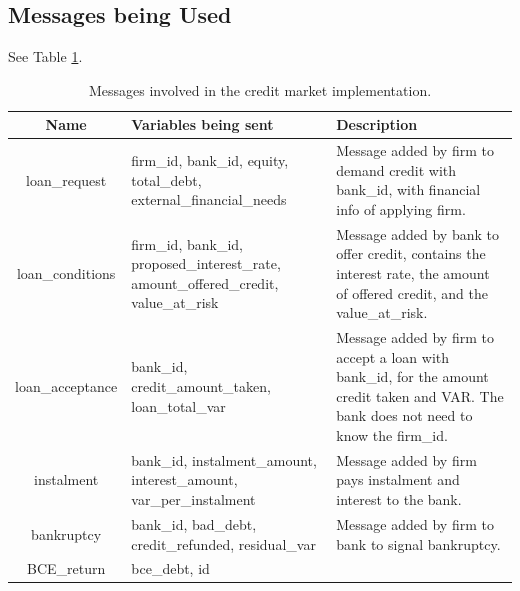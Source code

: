\subsection{Messages being Used}

See Table \ref{tab:creditmarketmsg}.

\begin{table}[!htb]\caption{Messages involved in the credit market implementation.}
\begin{center}
\begin{tabular}{|c|l|l|}
\hline
Name & Variables being sent & Description \\
\hline loan\_request & {\parbox[l]{5cm}{firm\_id, bank\_id, equity,
total\_debt, external\_financial\_needs}}& {\parbox[l]{5cm}{Message
added by firm to demand credit with bank\_id,
with financial info of applying firm.}} \\
\hline loan\_conditions & {\parbox[l]{5cm}{firm\_id, bank\_id,
proposed\_interest\_rate, amount\_offered\_credit, value\_at\_risk}}
& {\parbox[l]{5cm}{Message added by bank to offer credit, contains
the interest rate, the amount of
offered credit, and the value\_at\_risk.}}  \\

\hline loan\_acceptance & {\parbox[l]{5cm}{bank\_id,
credit\_amount\_taken, loan\_total\_var}} & {\parbox[l]{5cm}{Message
added by firm to accept a loan with bank\_id, for the amount credit
taken and VAR. The bank
does not need to know the firm\_id.}}   \\
\hline

instalment & {\parbox[l]{5cm}{bank\_id, instalment\_amount,
interest\_amount, var\_per\_instalment}} & {\parbox[l]{5cm}{Message
added by firm pays
instalment and interest to the bank.}}    \\

\hline bankruptcy & {\parbox[l]{5cm}{bank\_id, bad\_debt,
credit\_refunded, residual\_var}} &{\parbox[l]{5cm}{Message added by
firm to bank
to signal bankruptcy.}}  \\
\hline BCE\_return &
{\parbox[l]{5cm}{bce\_debt, id}} & {\parbox[l]{5cm}{}}  \\
\hline

\end{tabular}\end{center}\label{tab:creditmarketmsg}
\end{table}


